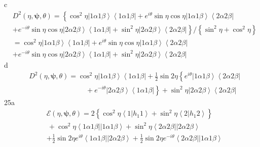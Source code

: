 \documentclass[aps,preprint]{revtex4}%
\begin{document}
c%
\begin{align*}
&  D^{2}\left(  \eta,\mathbf{\psi,}\theta\right)  =\left\{  \cos^{2}%
\eta\left\vert 1\alpha1\beta\right\rangle \left\langle 1\alpha1\beta
\right\vert +e^{i\theta}\sin\eta\cos\eta\left\vert 1\alpha1\beta\right\rangle
\left\langle 2\alpha2\beta\right\vert \right. \\
&  +\left.  e^{-i\theta}\sin\eta\cos\eta\left\vert 2\alpha2\beta\right\rangle
\left\langle 1\alpha1\beta\right\vert +\sin^{2}\eta\left\vert 2\alpha
2\beta\right\rangle \left\langle 2\alpha2\beta\right\vert \right\}  /\left\{
\sin^{2}\eta+\cos^{2}\eta\right\} \\
&  =\cos^{2}\eta\left\vert 1\alpha1\beta\right\rangle \left\langle
1\alpha1\beta\right\vert +e^{i\theta}\sin\eta\cos\eta\left\vert 1\alpha
1\beta\right\rangle \left\langle 2\alpha2\beta\right\vert \\
&  +e^{-i\theta}\sin\eta\cos\eta\left\vert 2\alpha2\beta\right\rangle
\left\langle 1\alpha1\beta\right\vert +\sin^{2}\eta\left\vert 2\alpha
2\beta\right\rangle \left\langle 2\alpha2\beta\right\vert
\end{align*}
d%
\begin{align*}
&  D^{2}\left(  \eta,\mathbf{\psi,}\theta\right)  =\cos^{2}\eta\left\vert
1\alpha1\beta\right\rangle \left\langle 1\alpha1\beta\right\vert +\frac{1}%
{2}\sin2\eta\left\{  e^{i\theta}\left\vert 1\alpha1\beta\right\rangle
\left\langle 2\alpha2\beta\right\vert \right. \\
&  \qquad\qquad\qquad\qquad+\left.  e^{-i\theta}\left\vert 2\alpha
2\beta\right\rangle \left\langle 1\alpha1\beta\right\vert \right\}  +\sin
^{2}\eta\left\vert 2\alpha2\beta\right\rangle \left\langle 2\alpha
2\beta\right\vert \,
\end{align*}
25a%
\begin{align*}
&  \mathcal{E}\left(  \eta,\mathbf{\psi,}\theta\right)  =2\left\{  \cos
^{2}\eta\left\langle 1\left\vert h_{1}1\right.  \right\rangle +\sin^{2}%
\eta\left\langle 2\left\vert h_{1}2\right.  \right\rangle \right\} \\
&  \,+\cos^{2}\eta\left\langle 1\alpha1\beta\right\vert \left\vert
1\alpha1\beta\right\rangle +\sin^{2}\eta\left\langle 2\alpha2\beta\right\vert
\left\vert 2\alpha2\beta\right\rangle \\
&  +\frac{1}{2}\sin2\eta e^{i\theta}\left\langle 1\alpha1\beta\right\vert
\left\vert 2\alpha2\beta\right\rangle +\frac{1}{2}\sin2\eta e^{-i\theta
}\left\langle 2\alpha2\beta\right\vert \left\vert 1\alpha1\beta\right\rangle
\end{align*}
\end{document}
